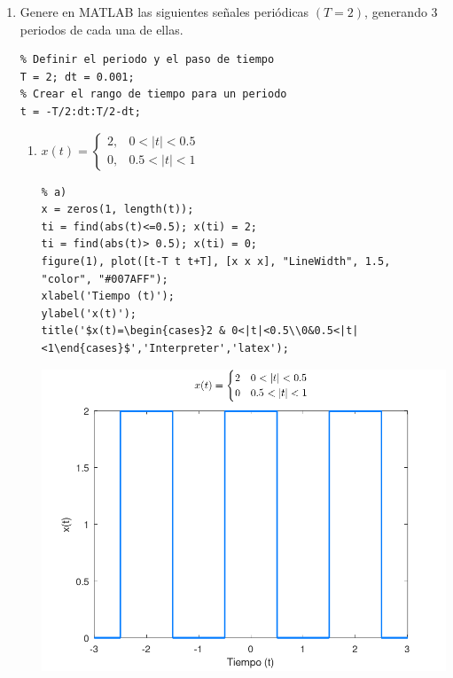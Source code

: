 \documentclass{article}
\begin{document}
\begin{enumerate}[leftmargin=*]
\item Genere en MATLAB las siguientes señales periódicas $(T=2)$, generando 3 periodos de cada una de ellas.

\begin{lstlisting}
% Definir el periodo y el paso de tiempo
T = 2; dt = 0.001;
% Crear el rango de tiempo para un periodo
t = -T/2:dt:T/2-dt;
\end{lstlisting}
\begin{enumerate}[label=\alph*)]
\item $x(t)=\begin{cases}
2, & 0<|t|<0.5\\
0,&0.5<|t|<1
\end{cases}$

\begin{lstlisting}
% a)
x = zeros(1, length(t));
ti = find(abs(t)<=0.5); x(ti) = 2;
ti = find(abs(t)> 0.5); x(ti) = 0;
figure(1), plot([t-T t t+T], [x x x], "LineWidth", 1.5, "color", "#007AFF");
xlabel('Tiempo (t)');
ylabel('x(t)');
title('$x(t)=\begin{cases}2 & 0<|t|<0.5\\0&0.5<|t|<1\end{cases}$','Interpreter','latex');
\end{lstlisting}

\begin{center}
\includegraphics[width=0.5\linewidth]{Imágenes/Figura1}
\end{center}


\end{enumerate}
\end{enumerate}
\end{document}
